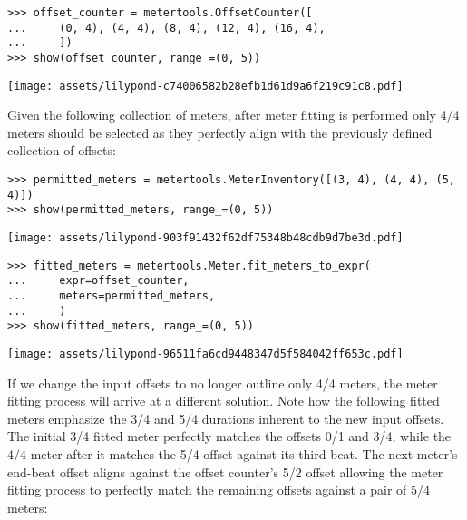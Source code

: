 \begin{abjadbookoutput}
\begin{singlespacing}
\vspace{-0.5\baselineskip}
\begin{verbatim}
>>> offset_counter = metertools.OffsetCounter([
...     (0, 4), (4, 4), (8, 4), (12, 4), (16, 4),
...     ])
>>> show(offset_counter, range_=(0, 5))
\end{verbatim}
\noindent\texttt{[image: assets/lilypond-c74006582b28efb1d61d9a6f219c91c8.pdf]}
\end{singlespacing}
\end{abjadbookoutput}

\noindent Given the following collection of meters, after meter fitting is
performed only 4/4 meters should be selected as they perfectly align with
the previously defined collection of offsets:

\begin{comment}
<abjad>
permitted_meters = metertools.MeterInventory([(3, 4), (4, 4), (5, 4)])
show(permitted_meters, range_=(0, 5))
fitted_meters = metertools.Meter.fit_meters_to_expr(
    expr=offset_counter,
    meters=permitted_meters,
    )
show(fitted_meters, range_=(0, 5))
</abjad>
\end{comment}

\begin{abjadbookoutput}
\begin{singlespacing}
\vspace{-0.5\baselineskip}
\begin{verbatim}
>>> permitted_meters = metertools.MeterInventory([(3, 4), (4, 4), (5, 4)])
>>> show(permitted_meters, range_=(0, 5))
\end{verbatim}
\noindent\texttt{[image: assets/lilypond-903f91432f62df75348b48cdb9d7be3d.pdf]}
\begin{verbatim}
>>> fitted_meters = metertools.Meter.fit_meters_to_expr(
...     expr=offset_counter,
...     meters=permitted_meters,
...     )
>>> show(fitted_meters, range_=(0, 5))
\end{verbatim}
\noindent\texttt{[image: assets/lilypond-96511fa6cd9448347d5f584042ff653c.pdf]}
\end{singlespacing}
\end{abjadbookoutput}

\noindent If we change the input offsets to no longer outline only 4/4 meters,
the meter fitting process will arrive at a different solution. Note how the
following fitted meters emphasize the 3/4 and 5/4 durations inherent to the new
input offsets. The initial 3/4 fitted meter perfectly matches the offsets 0/1
and 3/4, while the 4/4 meter after it matches the 5/4 offset against its
third beat. The next meter's end-beat offset aligns against the offset
counter's 5/2 offset allowing the meter fitting process to perfectly match the
remaining offsets against a pair of 5/4 meters:

